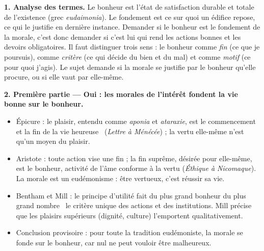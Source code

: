 \documentclass[11pt]{article}
\newcommand{\cle}[1]{{\popxbold\color{popdark}#1}}
\begin{document}
\begin{corrige}

\textbf{1. Analyse des termes.} Le \cle{bonheur} est l'état de satisfaction durable et totale de l'existence (grec \emph{eudaimonia}). Le \cle{fondement} est ce sur quoi un édifice repose, ce qui le justifie en dernière instance. Demander si le bonheur est le fondement de la morale, c'est donc demander si c'est lui qui rend les actions bonnes et les devoirs obligatoires. Il faut distinguer trois sens : le bonheur comme \emph{fin} (ce que je poursuis), comme \emph{critère} (ce qui décide du bien et du mal) et comme \emph{motif} (ce pour quoi j'agis). Le sujet demande si la morale se justifie par le bonheur qu'elle procure, ou si elle vaut par elle-même.

\textbf{2. Première partie — Oui : les morales de l'intérêt fondent la vie bonne sur le bonheur.}
\begin{itemize}
\item Épicure : le plaisir, entendu comme \emph{aponia} et \emph{ataraxie}, est \guillemotleft le commencement et la fin de la vie heureuse \guillemotright\ (\emph{Lettre à Ménécée}) ; la vertu elle-même n'est qu'un moyen du plaisir.
\item Aristote : toute action vise une fin ; la fin suprême, désirée pour elle-même, est le bonheur, activité de l'âme conforme à la vertu (\emph{Éthique à Nicomaque}). La morale est un eudémonisme : être vertueux, c'est réussir sa vie.
\item Bentham et Mill : le principe d'utilité fait du \guillemotleft plus grand bonheur du plus grand nombre \guillemotright\ le critère unique des actions et des institutions. Mill précise que les plaisirs supérieurs (dignité, culture) l'emportent qualitativement.
\item Conclusion provisoire : pour toute la tradition eudémoniste, la morale se fonde sur le bonheur, car nul ne peut vouloir être malheureux.
\end{itemize}


\end{corrige}
\end{document}
